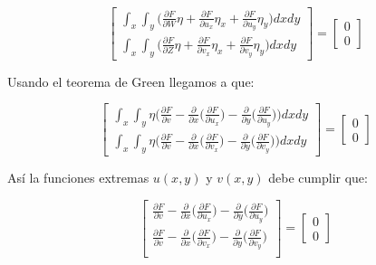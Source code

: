 \documentclass[conference]{IEEEtran}
\begin{document}
$$
    \begin{bmatrix}
        \int_x \int_y \Big(
            \frac{\partial F}{\partial W} \eta
            + \frac{\partial F}{\partial u_x} \eta_x
            + \frac{\partial F}{\partial u_y} \eta_y
            \Big) dx dy \\
        \int_x \int_y \Big(
            \frac{\partial F}{\partial Z} \eta
            + \frac{\partial F}{\partial v_x} \eta_x
            + \frac{\partial F}{\partial v_y} \eta_y
            \Big) dx dy
        \end{bmatrix} = \begin{bmatrix}
            0\\
            0
        \end{bmatrix}
$$

Usando el teorema de Green llegamos a que:

$$
    \begin{bmatrix}
        \int_x \int_y \eta \Big(
        \frac{\partial F}{\partial v}
        - \frac{\partial }{\partial x} \big(\frac{\partial F}{\partial u_x}\big)
        - \frac{\partial }{\partial y} \big(\frac{\partial F}{\partial u_y}\big)
        \Big) dx dy\\
        \int_x \int_y \eta \Big(
        \frac{\partial F}{\partial v}
        - \frac{\partial }{\partial x} \big(\frac{\partial F}{\partial v_x}\big)
        - \frac{\partial }{\partial y} \big(\frac{\partial F}{\partial v_y}\big)
        \Big) dx dy
        \end{bmatrix} = \begin{bmatrix}
            0\\
            0
        \end{bmatrix}
$$

Así la funciones extremas $u(x, y)$ y $v(x,y)$ debe cumplir que:


\begin{equation}
    \begin{bmatrix}
    \frac{\partial F}{\partial v}
    - \frac{\partial }{\partial x} \big(\frac{\partial F}{\partial u_x}\big)
    - \frac{\partial }{\partial y} \big(\frac{\partial F}{\partial u_y}\big)\\
    \frac{\partial F}{\partial v}
    - \frac{\partial }{\partial x} \big(\frac{\partial F}{\partial v_x}\big)
    - \frac{\partial }{\partial y} \big(\frac{\partial F}{\partial v_y}\big)\\
    \end{bmatrix} = \begin{bmatrix}
        0\\
        0
    \end{bmatrix}
\end{equation}
\end{document}
